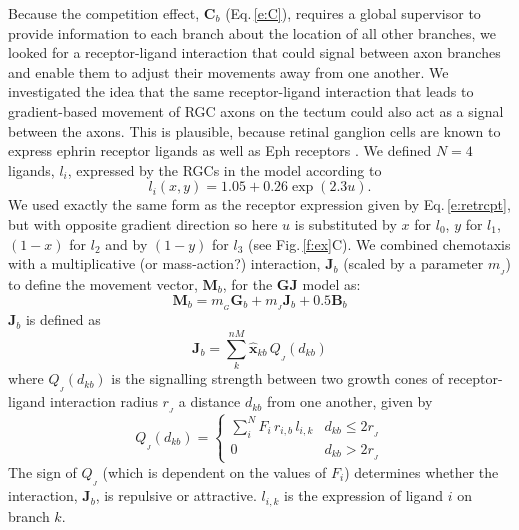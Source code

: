 \documentclass[11pt, a4paper, draft]{article}
\begin{document}
Because the competition effect, $\mathbf{C}_b$ (Eq.\,\ref{e:C}), requires a
global supervisor to provide information to each branch about the location of
all other branches, we looked for a receptor-ligand interaction that could
signal between axon branches and enable them to adjust their movements away
from one another. We investigated the idea that the same receptor-ligand
interaction that leads to gradient-based movement of RGC axons on the tectum
could also act as a signal between the axons. This is plausible, because
retinal ganglion cells are known to express ephrin receptor ligands as well as
Eph receptors \citep{ephrins_on_RGCs}. We defined $N=4$ ligands, $l_i$,
expressed by the RGCs in the model according to
%
\begin{equation} \label{e:retlig}
l_i(x,y) = 1.05 + 0.26 \exp(2.3 u).
\end{equation}
%
We used exactly the same form as the receptor expression given by
Eq.\,\ref{e:retrcpt}, but with opposite gradient direction so here $u$ is
substituted by $x$ for $l_0$, $y$ for $l_1$, $(1-x)$ for $l_2$ and by $(1-y)$
for $l_3$ (see Fig.\,\ref{f:ex}C).
%
We combined chemotaxis with a multiplicative (or mass-action?) interaction,
$\mathbf{J}_b$ (scaled by a parameter $m_{\!_J}$) to define the movement
vector, $\mathbf{M}_b$, for the $\mathbf{GJ}$ model as:
%
\begin{equation} \label{e:mv3}
 \mathbf{M}_{b} = m_{\!_G} \mathbf{G}_b + m_{\!_J} \mathbf{J}_b + 0.5 \mathbf{B}_b
\end{equation}
%
$\mathbf{J}_b$ is defined as
%
\begin{equation}
\mathbf{J}_b = \sum_k^{nM} \hat{\mathbf{x}}_{kb}\,Q_{\!_J}(d_{kb})
\end{equation}
%
where $Q_{\!_J}(d_{kb})$ is the signalling strength between two growth cones of
receptor-ligand interaction radius $r_{\!_J}$ a distance $d_{kb}$ from one another,
given by
%
\begin{equation}
Q_{\!_J}(d_{kb}) = \begin{cases}
     \sum_i^N F_i\,r_{i,b}\,l_{i,k}    & d_{kb} \leq 2r_{\!_J} \\
     0 & d_{kb} > 2r_{\!_J}
     \end{cases}
\end{equation}
%
The sign of $Q_{\!_J}$ (which is dependent on the values of $F_i$) determines
whether the interaction, $\mathbf{J}_b$, is repulsive or attractive. $l_{i,k}$
is the expression of ligand $i$ on branch $k$.
\end{document}

